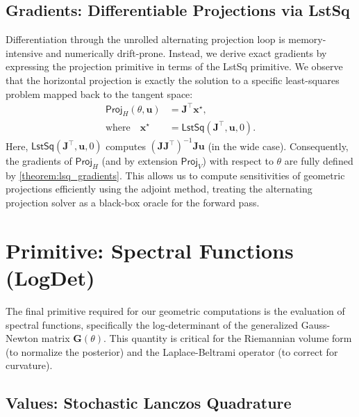 \subsection{Gradients: Differentiable Projections via \textsf{LstSq}}
\label{subsec:proj_grads}
Differentiation through the unrolled alternating projection loop is memory-intensive and numerically drift-prone. Instead, we derive exact gradients by expressing the projection primitive in terms of the \textsf{LstSq} primitive.
We observe that the horizontal projection is exactly the solution to a specific least-squares problem mapped back to the tangent space:
\begin{align}
    \textsf{Proj}_H(\theta, \mathbf{u}) &= \mathbf{J}^\top \mathbf{x}^\star, \\
    \text{where} \quad \mathbf{x}^\star &= \textsf{LstSq}(\mathbf{J}^\top, \mathbf{u}, 0).
\end{align}
Here, $\textsf{LstSq}(\mathbf{J}^\top, \mathbf{u}, 0)$ computes $(\mathbf{J}\mathbf{J}^\top)^{-1}\mathbf{J}\mathbf{u}$ (in the wide case). Consequently, the gradients of $\textsf{Proj}_H$ (and by extension $\textsf{Proj}_V$) with respect to $\theta$ are fully defined by \cref{theorem:lsq_gradients}. This allows us to compute sensitivities of geometric projections efficiently using the adjoint method, treating the alternating projection solver as a black-box oracle for the forward pass.

\section{Primitive: Spectral Functions (\textsf{LogDet})}
\label{sec:logdet_primitive}

The final primitive required for our geometric computations is the evaluation of spectral functions, specifically the log-determinant of the generalized Gauss-Newton matrix $\mathbf{G}(\theta)$. This quantity is critical for the Riemannian volume form (to normalize the posterior) and the Laplace-Beltrami operator (to correct for curvature).

\subsection{Values: Stochastic Lanczos Quadrature}

